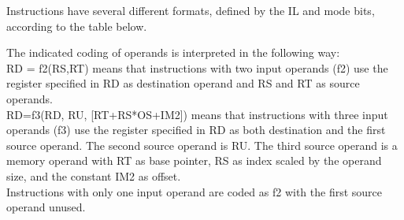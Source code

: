 \documentclass[forwardcom.tex]{subfiles}
\begin{document}
Instructions have several different formats, defined by the IL and mode bits, according to the table below.\\
\vspace{2mm}

The indicated coding of operands is interpreted in the following way: \\
RD = f2(RS,RT)  means that instructions with two input operands (f2) use the register specified in RD as destination operand and RS and RT as source operands.\\
RD=f3(RD, RU, [RT+RS*OS+IM2])  means that instructions with three input operands (f3) use the register specified in RD as both destination and the first source operand. The second source operand is RU. The third source operand is a memory operand with RT as base pointer, RS as index scaled by the operand size, and the constant IM2 as offset.\\
Instructions with only one input operand are coded as f2 with the first source operand unused.
\end{document}
